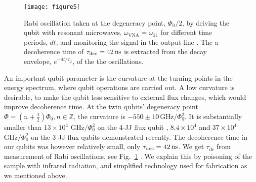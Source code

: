  
 \begin{figure}[h!]
   \texttt{[image: figure5]}
   \caption{Rabi oscillation taken  at the degeneracy point,  $ \Phi_0/2 $, by  driving the qubit
     with  resonant  microwaves,  $\omega_{\text{VNA}}  =   \omega_{21}$  for  different  time  periods,
     $ dt $, and monitoring the signal in the output line \cite{rabi}.  The a decoherence time
     of  $  \tau_{\text{dec}}   =  42\,\text{ns}  $  is  extracted  from   the  decay  envelope,
     $ e^{-dt/\tau_\varphi} $, of the the oscillations. \label{fig:rabi}}
 \end{figure}
 An important qubit parameter  is the curvature at the turning points  in the energy spectrum,
 where qubit operations are carried out.  A low curvature is desirable, to make the qubit less
 sensitive  to external  flux changes,  which  would improve  decoherence time.   At the  twin
 qubits'  degeneracy point  $ \Phi  =  (n +  \frac{1}{2})\Phi_0,  n\in\mathbb{Z} $,  the curvature  is
 $   -550\pm10\,\text{GHz}/\Phi_0^2  $.    It  is   substantially  smaller   than  $   13\times  10^4$
 $ \text{GHz}/\Phi_0^2$ on the 4-JJ flux qubit \cite{stern2014}, $ 8.4 \times 10^4$ \cite{zhu2010} and
 $ 37\times 10^{4}$ $ \text{GHz}/\Phi_0^2$ \cite{gustavsson2012}  on the 3-JJ flux qubits demonstrated
 recently.   The  decoherence   time  in  our  qubits  was  however   relatively  small,  only
 $  \tau_\text{dec}  =  42\,\text{ns}  $.   We   get  $\tau_\text{dc}$  from  measurement  of  Rabi
 oscillations,  see Fig.~\ref{fig:rabi}  \cite{rabi}.  We  explain  this by  poisoning of  the
 sample  with  infrared radiation,  and  simplified  technology  used  for fabrication  as  we
 mentioned above.


